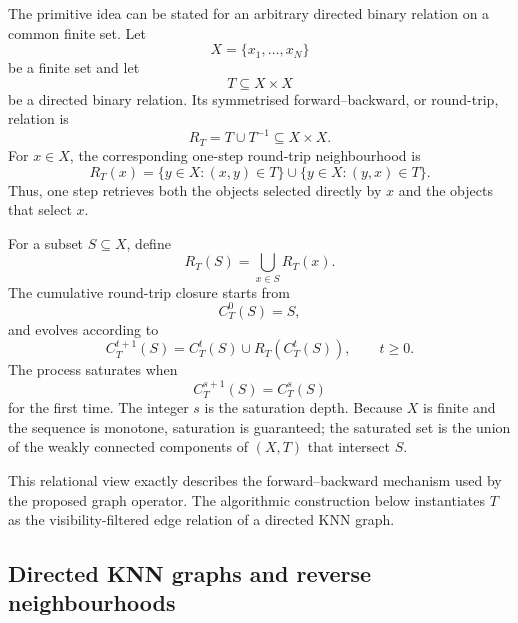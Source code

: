 \documentclass[review,12pt]{elsarticle}
\begin{document}
The primitive idea can be stated for an arbitrary directed binary relation on
a common finite set.  Let
\begin{equation}
X=\{x_1,\ldots,x_N\}
\end{equation}
be a finite set and let
\begin{equation}
T\subseteq X\times X
\end{equation}
be a directed binary relation.  Its symmetrised forward--backward, or
round-trip, relation is
\begin{equation}
R_T=T\cup T^{-1}\subseteq X\times X.
\end{equation}
For $x\in X$, the corresponding one-step round-trip neighbourhood is
\begin{equation}
R_T(x)=\{y\in X:(x,y)\in T\}\cup\{y\in X:(y,x)\in T\}.
\label{eq:relational_roundtrip}
\end{equation}
Thus, one step retrieves both the objects selected directly by $x$ and the
objects that select $x$.

For a subset $S\subseteq X$, define
\begin{equation}
R_T(S)=\bigcup_{x\in S}R_T(x).
\end{equation}
The cumulative round-trip closure starts from
\begin{equation}
C_T^0(S)=S,
\end{equation}
and evolves according to
\begin{equation}
C_T^{t+1}(S)=C_T^t(S)\cup R_T(C_T^t(S)),\qquad t\geq 0.
\label{eq:relational_iteration}
\end{equation}
The process saturates when
\begin{equation}
C_T^{s+1}(S)=C_T^s(S)
\end{equation}
for the first time.  The integer $s$ is the saturation depth.  Because $X$ is
finite and the sequence is monotone, saturation is guaranteed; the saturated
set is the union of the weakly connected components of $(X,T)$ that intersect
$S$.

This relational view exactly describes the forward--backward mechanism used by
the proposed graph operator.  The algorithmic construction below instantiates
$T$ as the visibility-filtered edge relation of a directed KNN graph.

\subsection{Directed KNN graphs and reverse neighbourhoods}\label{sec:knn_graph}
\end{document}
